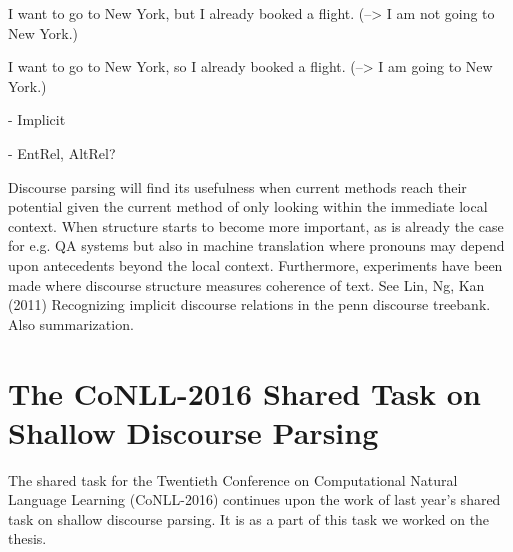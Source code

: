 I want to go to New York, but I already booked a flight.  (--> I am not going to New York.)

I want to go to New York, so I already booked a flight. (--> I am going to New York.)


- Implicit

- EntRel, AltRel?


Discourse parsing will find its usefulness when current methods reach their potential given the current method of only looking within the immediate local context. When structure starts to become more important, as is already the case for e.g. QA systems but also in machine translation where pronouns may depend upon antecedents beyond the local context. Furthermore, experiments have been made where discourse structure measures coherence of text. See Lin, Ng, Kan (2011) Recognizing implicit discourse relations in the penn discourse treebank. Also summarization.


\section{The CoNLL-2016 Shared Task on Shallow Discourse Parsing}

The shared task for the Twentieth Conference on Computational Natural Language Learning (CoNLL-2016) continues upon the work of last year's shared task on shallow discourse parsing. It is as a part of this task we worked on the thesis.
